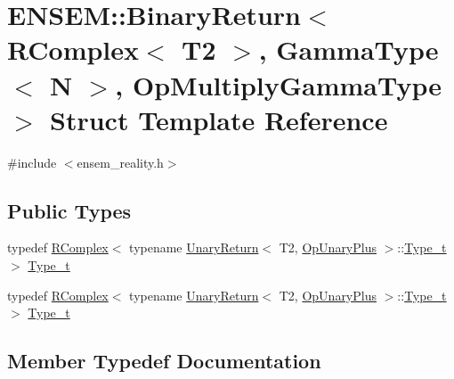 \hypertarget{structENSEM_1_1BinaryReturn_3_01RComplex_3_01T2_01_4_00_01GammaType_3_01N_01_4_00_01OpMultiplyGammaType_01_4}{}\section{E\+N\+S\+EM\+:\+:Binary\+Return$<$ R\+Complex$<$ T2 $>$, Gamma\+Type$<$ N $>$, Op\+Multiply\+Gamma\+Type $>$ Struct Template Reference}
\label{structENSEM_1_1BinaryReturn_3_01RComplex_3_01T2_01_4_00_01GammaType_3_01N_01_4_00_01OpMultiplyGammaType_01_4}


{\ttfamily \#include $<$ensem\+\_\+reality.\+h$>$}

\subsection*{Public Types}
\begin{DoxyCompactItemize}
\item 
typedef \mbox{\hyperlink{classENSEM_1_1RComplex}{R\+Complex}}$<$ typename \mbox{\hyperlink{structENSEM_1_1UnaryReturn}{Unary\+Return}}$<$ T2, \mbox{\hyperlink{structENSEM_1_1OpUnaryPlus}{Op\+Unary\+Plus}} $>$\+::\mbox{\hyperlink{structENSEM_1_1BinaryReturn_3_01RComplex_3_01T2_01_4_00_01GammaType_3_01N_01_4_00_01OpMultiplyGammaType_01_4_a259c20af5404705bcd958ee95cec920a}{Type\+\_\+t}} $>$ \mbox{\hyperlink{structENSEM_1_1BinaryReturn_3_01RComplex_3_01T2_01_4_00_01GammaType_3_01N_01_4_00_01OpMultiplyGammaType_01_4_a259c20af5404705bcd958ee95cec920a}{Type\+\_\+t}}
\item 
typedef \mbox{\hyperlink{classENSEM_1_1RComplex}{R\+Complex}}$<$ typename \mbox{\hyperlink{structENSEM_1_1UnaryReturn}{Unary\+Return}}$<$ T2, \mbox{\hyperlink{structENSEM_1_1OpUnaryPlus}{Op\+Unary\+Plus}} $>$\+::\mbox{\hyperlink{structENSEM_1_1BinaryReturn_3_01RComplex_3_01T2_01_4_00_01GammaType_3_01N_01_4_00_01OpMultiplyGammaType_01_4_a259c20af5404705bcd958ee95cec920a}{Type\+\_\+t}} $>$ \mbox{\hyperlink{structENSEM_1_1BinaryReturn_3_01RComplex_3_01T2_01_4_00_01GammaType_3_01N_01_4_00_01OpMultiplyGammaType_01_4_a259c20af5404705bcd958ee95cec920a}{Type\+\_\+t}}
\end{DoxyCompactItemize}


\subsection{Member Typedef Documentation}
\mbox{\label{structENSEM_1_1BinaryReturn_3_01RComplex_3_01T2_01_4_00_01GammaType_3_01N_01_4_00_01OpMultiplyGammaType_01_4_a259c20af5404705bcd958ee95cec920a}} 
